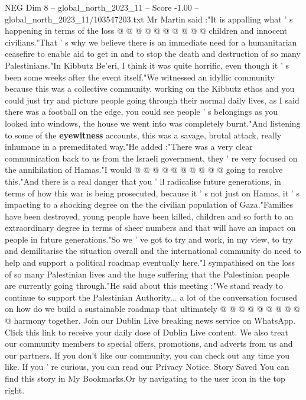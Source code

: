 \begin{textsample}{NEG Dim 8 – global\_north\_2023\_11 – Score -1.00 – global\_north\_2023\_11/103547203.txt}
Mr Martin said :"It is appalling what ' s happening in terms of the loss @ @ @ @ @ @ @ @ @ @ children and innocent civilians."That ' s why we believe there is an immediate need for a humanitarian ceasefire to enable aid to get in and to stop the death and destruction of so many Palestinians."In Kibbutz Be'eri, I think it was quite horrific, even though it ' s been some weeks after the event itself."We witnessed an idyllic community because this was a collective community, working on the Kibbutz ethos and you could just try and picture people going through their normal daily lives, as I said there was a football on the edge, you could see people ' s belongings as you looked into windows, the house we went into was completely burnt."And listening to some of the \textbf{eyewitness} accounts, this was a savage, brutal attack, really inhumane in a premeditated way."He added :"There was a very clear communication back to us from the Israeli government, they ' re very focused on the annihilation of Hamas."I would @ @ @ @ @ @ @ @ @ @ going to resolve this."And there is a real danger that you ' ll radicalise future generations, in terms of how this war is being prosecuted, because it ' s not just on Hamas, it ' s impacting to a shocking degree on the the civilian population of Gaza."Families have been destroyed, young people have been killed, children and so forth to an extraordinary degree in terms of sheer numbers and that will have an impact on people in future generations."So we ' ve got to try and work, in my view, to try and demilitarise the situation overall and the international community do need to help and support a political roadmap eventually here."I sympathised on the loss of so many Palestinian lives and the huge suffering that the Palestinian people are currently going through."He said about this meeting :"We stand ready to continue to support the Palestinian Authority... a lot of the conversation focused on how do we build a sustainable roadmap that ultimately @ @ @ @ @ @ @ @ @ @ harmony together.
Join our Dublin Live breaking news service on WhatsApp.
Click this link to receive your daily dose of Dublin Live content.
We also treat our community members to special offers, promotions, and adverts from us and our partners.
If you don't like our community, you can check out any time you like.
If you ' re curious, you can read our Privacy Notice.
Story Saved You can find this story in My Bookmarks.Or by navigating to the user icon in the top right.

\end{textsample}
